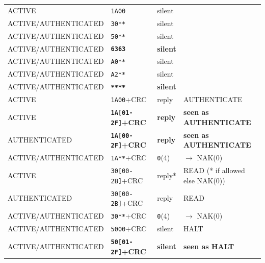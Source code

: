 \begin{longtable}{l l l l}
ACTIVE               & \texttt{1A00}                       & silent          &                                             \\
ACTIVE/AUTHENTICATED & \texttt{30**}                       & silent          &                                             \\
ACTIVE/AUTHENTICATED & \texttt{50**}                       & silent          &                                             \\
ACTIVE/AUTHENTICATED & \textbf{\texttt{6363}}              & \textbf{silent} &                                             \\
ACTIVE/AUTHENTICATED & \texttt{A0**}                       & silent          &                                             \\
ACTIVE/AUTHENTICATED & \texttt{A2**}                       & silent          &                                             \\
ACTIVE/AUTHENTICATED & \textbf{\texttt{****}}              & \textbf{silent} &                                             \\
ACTIVE               & \texttt{1A00}+CRC                   & reply           & AUTHENTICATE                                \\
ACTIVE               & \textbf{\texttt{1A[01-2F]}+CRC}     & \textbf{reply}  & \textbf{seen as AUTHENTICATE}               \\
AUTHENTICATED        & \textbf{\texttt{1A[00-2F]}+CRC}     & \textbf{reply}  & \textbf{seen as AUTHENTICATE}               \\
ACTIVE/AUTHENTICATED & \texttt{1A**}+CRC                   & \texttt{0}(4)   & $\rightarrow$ NAK(0)                        \\
ACTIVE               & \texttt{30[00-2B]}+CRC              & reply*          & READ (* if allowed else NAK(0))             \\
AUTHENTICATED        & \texttt{30[00-2B]}+CRC              & reply           & READ                                        \\
ACTIVE/AUTHENTICATED & \texttt{30**}+CRC                   & \texttt{0}(4)   & $\rightarrow$ NAK(0)                        \\
ACTIVE/AUTHENTICATED & \texttt{5000}+CRC                   & silent          & HALT                                        \\
ACTIVE/AUTHENTICATED & \textbf{\texttt{50[01-2F]}+CRC}     & \textbf{silent} & \textbf{seen as HALT}                       \\

\end{longtable}

